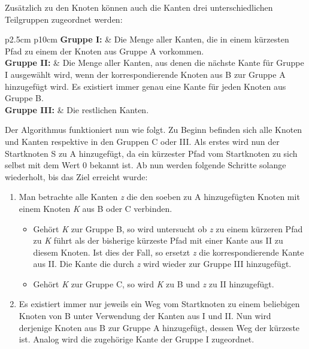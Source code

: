 		Zusätzlich zu den Knoten können auch die Kanten drei unterschiedlichen Teilgruppen zugeordnet werden\cite{DijkstraAlg}:
		
		\begin{tabular}{p{2.5cm} p{10cm}}
			\textbf{Gruppe I:} & Die Menge aller Kanten, die in einem kürzesten Pfad zu einem der Knoten aus Gruppe A vorkommen.\\[0.25cm]
			\textbf{Gruppe II:} & Die Menge aller Kanten, aus denen die nächste Kante für Gruppe I ausgewählt wird, wenn der korrespondierende Knoten aus B zur Gruppe A hinzugefügt wird. Es existiert immer genau eine Kante für jeden Knoten aus Gruppe B. \\[0.25cm]
			\textbf{Gruppe III:} & Die restlichen Kanten.\\[0.25cm]
		\end{tabular}
		
		Der Algorithmus funktioniert nun wie folgt. Zu Beginn befinden sich alle Knoten und Kanten respektive in den Gruppen C oder III. Als erstes wird nun der Startknoten S zu A hinzugefügt, da ein kürzester Pfad vom Startknoten zu sich selbst mit dem Wert 0 bekannt ist. Ab nun werden folgende Schritte solange wiederholt, bis das Ziel erreicht wurde:
		\begin{center}
			\begin{minipage}{0.8\linewidth}

				\begin{enumerate}
					\item Man betrachte alle Kanten \textit{z} die den soeben zu A hinzugefügten Knoten mit einem Knoten \textit{K} aus B oder C verbinden. 
					\begin{itemize}
						\item Gehört \textit{K} zur Gruppe B, so wird untersucht ob \textit{z} zu einem kürzeren Pfad zu \textit{K} führt als der bisherige kürzeste Pfad mit einer Kante aus II zu diesem Knoten. Ist dies der Fall, so ersetzt \textit{z} die korrespondierende Kante aus II. Die Kante die durch \textit{z} wird wieder zur Gruppe III hinzugefügt.
						\item Gehört \textit{K} zur Gruppe  C, so wird \textit{K} zu B und \textit{z} zu II hinzugefügt.
					\end{itemize}
					\item Es existiert immer nur jeweils ein Weg vom Startknoten zu einem beliebigen Knoten von B unter Verwendung der Kanten aus I und II. Nun wird derjenige Knoten aus B zur Gruppe A hinzugefügt, dessen Weg der kürzeste ist. Analog wird die zugehörige Kante der Gruppe I zugeordnet.
				\end{enumerate}
			\end{minipage}
		\end{center}
